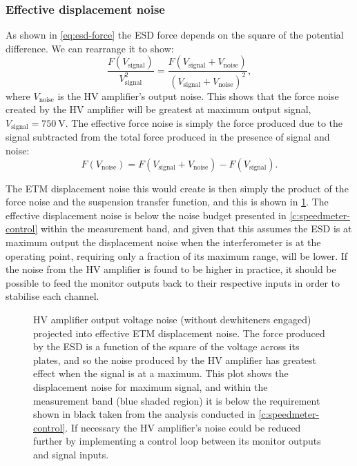 \subsubsection{Effective displacement noise}
As shown in \cref{eq:esd-force} the \gls{ESD} force depends on the square of the potential difference. We can rearrange it to show:
\begin{equation}
  \frac{F \left( V_{\text{signal}} \right)}{V_{\text{signal}}^2} = \frac{F \left( V_{\text{signal}} + V_{\text{noise}} \right)}{\left( V_{\text{signal}} + V_{\text{noise}} \right)^2},
\end{equation}
where $V_{\text{noise}}$ is the \gls{HV} amplifier's output noise. This shows that the force noise created by the \gls{HV} amplifier will be greatest at maximum output signal, $V_{\text{signal}} = \SI{750}{\volt}$. The effective force noise is simply the force produced due to the signal subtracted from the total force produced in the presence of signal and noise:
\begin{equation}
  F \left( V_{\text{noise}} \right) = F \left( V_{\text{signal}} + V_{\text{noise}} \right) - F \left( V_{\text{signal}} \right).
\end{equation}

The \gls{ETM} displacement noise this would create is then simply the product of the force noise and the suspension transfer function, and this is shown in \cref{fig:hv-amp-output-displacement-noise}. The effective displacement noise is below the noise budget presented in \cref{c:speedmeter-control} within the measurement band, and given that this assumes the \gls{ESD} is at maximum output the displacement noise when the interferometer is at the operating point, requiring only a fraction of its maximum range, will be lower. If the noise from the \gls{HV} amplifier is found to be higher in practice, it should be possible to feed the monitor outputs back to their respective inputs in order to stabilise each channel.

\begin{figure}[htp]
  \centering
  
  \caption[High voltage amplifier output projected end test mass displacement noise]{\gls{HV} amplifier output voltage noise (without dewhiteners engaged) projected into effective \gls{ETM} displacement noise. The force produced by the \gls{ESD} is a function of the square of the voltage across its plates, and so the noise produced by the \gls{HV} amplifier has greatest effect when the signal is at a maximum. This plot shows the displacement noise for maximum signal, and within the measurement band (blue shaded region) it is below the requirement shown in black taken from the analysis conducted in \cref{c:speedmeter-control}. If necessary the \gls{HV} amplifier's noise could be reduced further by implementing a control loop between its monitor outputs and signal inputs.}
  \label{fig:hv-amp-output-displacement-noise}
\end{figure}

